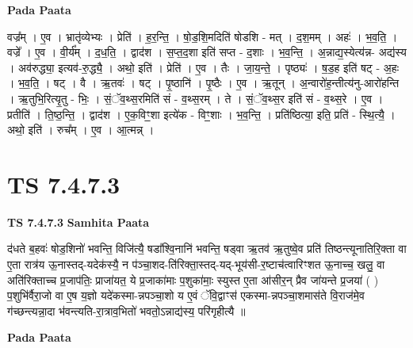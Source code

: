 \documentclass[17pt]{extarticle}
\begin{document}
\textbf{Pada Paata} \newline

वज्र᳚म् । ए॒व । भ्रातृ॑व्येभ्यः । प्रेति॑ । ह॒र॒न्ति॒ । षो॒ड॒शि॒मदिति॑ षोडशि - मत् । द॒श॒मम् । अहः॑ । भ॒व॒ति॒ । वज्रे᳚ । ए॒व । वी॒र्य᳚म् । द॒ध॒ति॒ । द्वाद॑श । स॒प्त॒द॒शा इति॑ सप्त - द॒शाः । भ॒व॒न्ति॒ । अ॒न्नाद्य॒स्येत्य॑न्न- अद्य॑स्य । अव॑रुद्ध्या॒ इत्यव॑-रु॒द्ध्यै॒ । अथो॒ इति॑ । प्रेति॑ । ए॒व । तैः । जा॒य॒न्ते॒ । पृष्ठ्यः॑ । ष॒ड॒ह इति॑ षट् - अ॒हः । भ॒व॒ति॒ । षट् । वै । ऋ॒तवः॑ । षट् । पृ॒ष्ठानि॑ । पृ॒ष्ठैः । ए॒व । ऋ॒तून् । अ॒न्वारो॑ह॒न्तीत्य॑नु-आरो॑हन्ति । ऋ॒तुभि॒रित्यृ॒तु - भिः॒ । सं॒ॅव॒थ्स॒रमिति॑ सं - व॒थ्स॒रम् । ते । सं॒ॅव॒थ्स॒र इति॑ सं - व॒थ्स॒रे । ए॒व । प्रतीति॑ । ति॒ष्ठ॒न्ति॒ । द्वाद॑श । ए॒क॒विꣳ॒॒शा इत्ये॑क - विꣳ॒॒शाः । भ॒व॒न्ति॒ । प्रति॑ष्ठित्या॒ इति॒ प्रति॑ - स्थि॒त्यै॒ । अथो॒ इति॑ । रुच᳚म् । ए॒व । आ॒त्मन्न् ।  \newline





\section{ TS 7.4.7.3 }

\textbf{TS 7.4.7.3 } \newline
\textbf{Samhita Paata} \newline

द॑धते ब॒हवः॑ षोड॒शिनो॑ भवन्ति॒ विजि॑त्यै॒ षडा᳚श्वि॒नानि॑ भवन्ति॒ षड्वा ऋ॒तव॑ ऋ॒तुष्वे॒व प्रति॑ तिष्ठन्त्यूनातिरि॒क्ता वा ए॒ता रात्र॑य ऊ॒नास्तद्-यदेक॑स्यै॒ न प॑ञ्चा॒शद-ति॑रिक्ता॒स्तद्-यद्-भूय॑सी-र॒ष्टाच॑त्वारिꣳशत ऊ॒नाच्च॒ खलु॒ वा अति॑रिक्ताच्च प्र॒जाप॑तिः॒ प्राजा॑यत॒ ये प्र॒जाका॑माः प॒शुका॑माः॒ स्युस्त ए॒ता आ॑सीर॒न् प्रैव जा॑यन्ते प्र॒जया॑ ( ) प॒शुभि॑र्वैरा॒जो वा ए॒ष य॒ज्ञो यदे॑कस्मा-न्नपञ्चा॒शो य ए॒वं ॅवि॒द्वाꣳस॑ एकस्मा-न्नपञ्चा॒शमास॑ते वि॒राज॑मे॒व ग॑च्छन्त्यन्ना॒दा भ॑वन्त्यति-रा॒त्राव॒भितो॑ भवतो॒ऽन्नाद्य॑स्य॒ परि॑गृहीत्यै ॥ \newline

\textbf{Pada Paata} \newline
\end{document}
